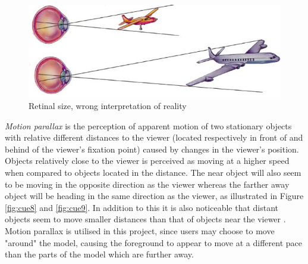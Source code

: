 \begin{figure}[h!]
   \centering
   \includegraphics[scale=1]{figures/cue7.jpg}
   \caption{Retinal size, wrong interpretation of reality \cite{Psych}}\label{fig:cue7}
\end{figure}

\textit{Motion parallax} is the perception of apparent motion of two stationary objects with relative different distances to the viewer (located respectively in front of and behind of the viewer’s fixation point) caused by changes in the viewer’s position. Objects relatively close to the viewer is perceived as moving at a higher speed when compared to objects located in the distance. The near object will also seem to be moving in the opposite direction as the viewer whereas the farther away object will be heading in the same direction as the viewer, as illustrated in Figure \ref{fig:cue8} and \ref{fig:cue9}. In addition to this it is also noticeable that distant objects seem to move smaller distances than that of objects near the viewer \cite{Gale} \cite{Shrestha2013} \cite{Skybrary}. Motion parallax is utilised in this project, since users may choose to move "around" the model, causing the foreground to appear to move at a different pace than the parts of the model which are further away.

